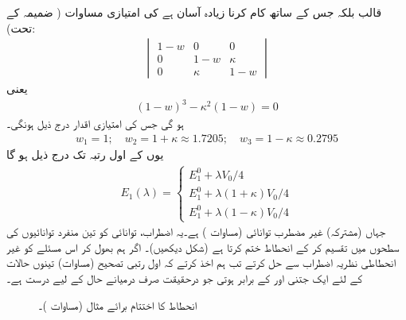 قالب  بلکہ  جس کے ساتھ کام کرنا زیادہ آسان ہے کی امتیازی مساوات ( ضمیمہ  کے تحت):
\begin{align*}
\begin{vmatrix}
1 - w & 0 & 0 \\
0 & 1 - w& \kappa \\
0 & \kappa & 1 - w
\end{vmatrix}
\end{align*}
یعنی
\begin{align*}
(1 - w)^3 - \kappa^2 (1 - w) = 0
\end{align*}
ہو گی جس کی امتیازی اقدار درج ذیل ہونگی۔ 
\begin{align*}
w_1 = 1; \quad w_2 = 1+ \kappa \approx 1.7205; \quad w_3 = 1 - \kappa \approx 0.2795
\end{align*}
یوں  کے اول رتبہ تک درج ذیل ہو گا 
\begin{align}\label{مساوات_غیر_مضطرب_توانائی_کعبی_کنواں}
E_1 (\lambda) = 
\begin{cases}
E_1^0 + \lambda V_0/4 \\
E_1^0 + \lambda (1+ \kappa) V_0 /4 \\
E_1^0 + \lambda (1 - \kappa) V_0 /4
\end{cases}
\end{align}
جہاں  (مشترکہ) غیر مضطرب توانائی (مساوات ) ہے۔یہ اضطراب، توانائی  کو تین منفرد توانائیوں کی سطحوں میں تقسیم کر کے انحطاط ختم کرتا ہے (شکل  دیکھیں)۔ اگر ہم بھول کر اس مسئلے کو غیر انحطاطی نظریہ اضطراب سے حل کرتے تب ہم اخذ کرتے کہ اول رتبی تصحیح (مساوات) تینوں حالات کے لئے ایک جتنی اور  کے برابر ہوتی جو درحقیقت صرف درمیانے حال کے لیے درست ہے۔

\begin{figure}
\centering
{}
\caption{انحطاط کا اختتام برائے مثال  (مساوات )۔}
\label{شکل_غیر_تابع_اضطراب_انحطاط_اختتام_مثال}
\end{figure}


